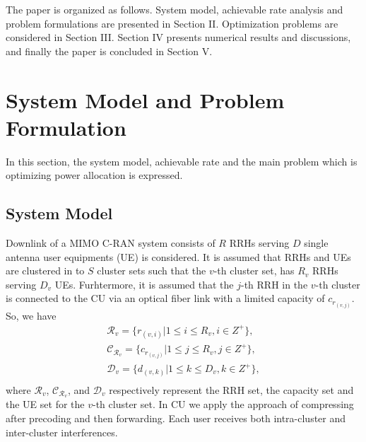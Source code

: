 \documentclass[conference,10pt,twocolumn,letter]{IEEEtran}
\begin{document}
The paper is organized as follows. System model, achievable rate analysis and problem formulations are presented in Section II. Optimization problems are considered in Section III. Section IV presents numerical results and discussions, and finally the paper is concluded in Section V.

\section{System Model and Problem Formulation}

In this section, the system model, achievable rate and the main problem which is optimizing power allocation is expressed.

\subsection{System Model}

Downlink of a MIMO C-RAN system consists of $R$ RRHs serving $D$ single antenna user equipments (UE) is considered. It is assumed that RRHs and UEs are clustered in to $S$ cluster sets such that the $v$-th cluster set, has $R_v$ RRHs serving ${D}_v$ UEs. Furhtermore, it is assumed that the $j$-th RRH in the $v$-th cluster is connected to the CU via an optical fiber link with a limited capacity of $c_{r_{(v,j)}}$. So, we have
\begin{equation}
\begin{split}
\mathcal{R}_v= \{  r_{(v,i)} | 1 \leq i \leq {R}_v , i\in Z^+\}, \\
\mathcal{C}_{\mathcal{R}_v}= \{c_{r_{(v,j)}}| 1 \leq j \leq {R}_v , j\in Z^+\}, \\
\mathcal{D}_v= \{  d_{(v,k)} | 1 \leq k \leq {D}_v , k\in Z^+\},  \\
\end{split}
\end{equation}
where $\mathcal{R}_v$, $\mathcal{C}_{\mathcal{R}_v}$, and $\mathcal{D}_v$ respectively represent the RRH set, the capacity set and the UE set  for the $v$-th cluster set.
In CU we apply the approach of compressing after precoding and then forwarding. Each user receives both intra-cluster and inter-cluster interferences.
\end{document}
